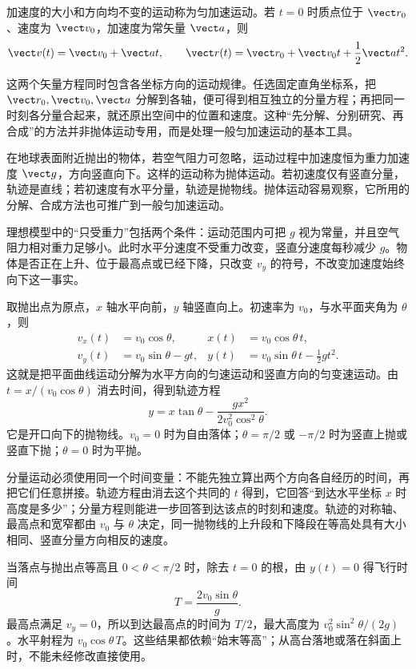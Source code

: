 
加速度的大小和方向均不变的运动称为匀加速运动。若 $t=0$ 时质点位于 $\vect r_0$、速度为 $\vect v_0$，加速度为常矢量 $\vect a$，则
\begin{equation}
 \vect v(t)=\vect v_0+\vect a t,\qquad
 \vect r(t)=\vect r_0+\vect v_0t+\frac12\vect a t^2.
\end{equation}

这两个矢量方程同时包含各坐标方向的运动规律。任选固定直角坐标系，把 $\vect r_0,\vect v_0,\vect a$ 分解到各轴，便可得到相互独立的分量方程；再把同一时刻各分量合起来，就还原出空间中的位置和速度。这种“先分解、分别研究、再合成”的方法并非抛体运动专用，而是处理一般匀加速运动的基本工具。

在地球表面附近抛出的物体，若空气阻力可忽略，运动过程中加速度恒为重力加速度 $\vect g$，方向竖直向下。这样的运动称为抛体运动。若初速度仅有竖直分量，轨迹是直线；若初速度有水平分量，轨迹是抛物线。抛体运动容易观察，它所用的分解、合成方法也可推广到一般匀加速运动。

理想模型中的“只受重力”包括两个条件：运动范围内可把 $g$ 视为常量，并且空气阻力相对重力足够小。此时水平分速度不受重力改变，竖直分速度每秒减少 $g$。物体是否正在上升、位于最高点或已经下降，只改变 $v_y$ 的符号，不改变加速度始终向下这一事实。

取抛出点为原点，$x$ 轴水平向前，$y$ 轴竖直向上。初速率为 $v_0$，与水平面夹角为 $\theta$，则
\begin{align}
v_x(t)&=v_0\cos\theta,&x(t)&=v_0\cos\theta\,t,\\
v_y(t)&=v_0\sin\theta-gt,&y(t)&=v_0\sin\theta\,t-\frac12gt^2.
\end{align}
这就是把平面曲线运动分解为水平方向的匀速运动和竖直方向的匀变速运动。由 $t=x/(v_0\cos\theta)$ 消去时间，得到轨迹方程
\begin{equation}
 \boxed{y=x\tan\theta-\frac{gx^2}{2v_0^2\cos^2\theta}}.
\end{equation}
它是开口向下的抛物线。$v_0=0$ 时为自由落体；$\theta=\pi/2$ 或 $-\pi/2$ 时为竖直上抛或竖直下抛；$\theta=0$ 时为平抛。

分量运动必须使用同一个时间变量：不能先独立算出两个方向各自经历的时间，再把它们任意拼接。轨迹方程由消去这个共同的 $t$ 得到，它回答“到达水平坐标 $x$ 时高度是多少”；分量方程则能进一步回答到达该点的时刻和速度。轨迹的对称轴、最高点和宽窄都由 $v_0$ 与 $\theta$ 决定，同一抛物线的上升段和下降段在等高处具有大小相同、竖直分量方向相反的速度。

当落点与抛出点等高且 $0<\theta<\pi/2$ 时，除去 $t=0$ 的根，由 $y(t)=0$ 得飞行时间
\begin{equation}
 T=\frac{2v_0\sin\theta}{g}.
\end{equation}
最高点满足 $v_y=0$，所以到达最高点的时间为 $T/2$，最大高度为 $v_0^2\sin^2\theta/(2g)$。水平射程为 $v_0\cos\theta\,T$。这些结果都依赖“始末等高”；从高台落地或落在斜面上时，不能未经修改直接使用。

